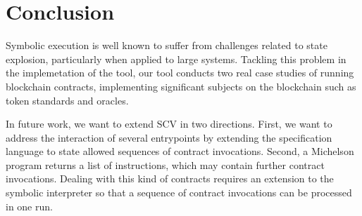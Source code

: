 \documentclass[runningheads]{llncs}
\begin{document}
\section{Conclusion}
\label{sec:concl-sect-append}
Symbolic execution is well known to suffer from challenges related to
state explosion, particularly when applied to large
systems. Tackling this problem in the implemetation of the tool, our tool conducts two real case studies of running blockchain contracts, implementing significant subjects on the blockchain such as token standards and oracles.

In future work, we want to extend SCV in two directions. 
First, we want to address the interaction of several entrypoints by
extending the specification language to state allowed sequences of
contract invocations.  Second, a Michelson program returns a list of instructions, which may contain
further contract invocations. Dealing with this kind of contracts
requires an extension to the symbolic interpreter so that a sequence
of contract invocations can be processed in one run.

\newpage



\newpage

\end{document}
